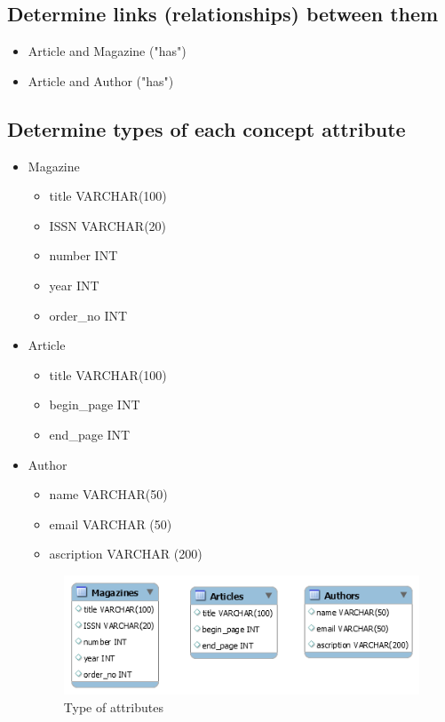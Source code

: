 \documentclass{article}
\begin{document}
\subsection{Determine links (relationships) between them}
\begin{itemize}
	\item Article and Magazine ("has")
	\item Article and Author ("has")
\end{itemize}
\subsection{Determine types of each concept attribute}
\begin{itemize}
	\item Magazine 
	\begin{itemize}
	\item title VARCHAR(100)
	\item ISSN VARCHAR(20)
	\item number INT
	\item year INT
	\item order\_no INT
	\end{itemize}
	\item Article 
	\begin{itemize}
	\item title VARCHAR(100)
	\item begin\_page INT
	\item end\_page INT
	\end{itemize} 
	\item Author 
	\begin{itemize}
	\item name VARCHAR(50)
	\item email VARCHAR (50)
	\item ascription VARCHAR (200)
	\end{itemize} 
\begin{figure}[h]
\centering
\includegraphics[scale = 0.7]{3.PNG}
\caption{Type of attributes}
\end{figure}
\end{itemize}
\end{document}
